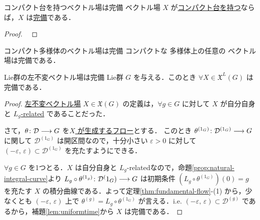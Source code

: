 \documentclass[TQFT_main]{subfiles}
\begin{document}
\begin{mytheo}[label=thm:complete-compace]{コンパクト台を持つベクトル場は完備}
    \cinfty ベクトル場 $X$ が\hyperref[def:vecf]{コンパクト台を持つ}ならば，$X$ は\hyperref[def:complete-vecf]{完備}である．
\end{mytheo}

\begin{proof}
    ~\cite[p.216, Theorem 9.16]{Lee2012smooth}
\end{proof}


\begin{mycol}[label=col:complete-compact]{コンパクト多様体のベクトル場は完備}
    コンパクトな \cinfty 多様体上の任意の \cinfty ベクトル場は完備である．
\end{mycol}


\begin{mytheo}[label=thm:left-invariant-complete]{Lie群の左不変ベクトル場は完備}
    Lie群 $G$ を与える．このとき $\forall X \in \mathfrak{X}^L(G)$ は完備である．
\end{mytheo}

\begin{proof}
    \hyperref[def:left-invariant]{左不変ベクトル場} $X \in \mathfrak{X}(G)$ の定義は，$\forall g \in G$ に対して $X$ が自分自身と \hyperref[def:F-related]{$L_g$-related} であることだった．

    さて，$\theta \colon \mathcal{D} \longrightarrow G$ を\hyperref[thm:fundamental-flow]{$X$ が生成するフロー}とする．
    このとき $\theta^{(1_G)} \colon \mathcal{D}^{(1_G)} \longrightarrow G$ に関して $\mathcal{D}^{(1_G)}$ は開区間なので，十分小さい $\varepsilon > 0$ に対して $(-\varepsilon,\, \varepsilon) \subset \mathcal{D}^{(1_G)}$ を充たすようにできる．

    $\forall g \in G$ を1つとる．$X$ は自分自身と $L_g$-relatedなので，命題\ref{prop:natural-integral-curve}より $L_g \circ \theta^{(1_g)} \colon \mathcal{D}^(1_G) \longrightarrow G$ は初期条件 $(L_g \circ \theta^{(1_G)})(0) = g$ を充たす $X$ の積分曲線である．よって定理\ref{thm:fundamental-flow}-(1) から，少なくとも $(-\varepsilon,\, \varepsilon)$ 上で $\theta^{(g)} = L_g \circ \theta^{(1_G)}$ が言える．i.e. $(-\varepsilon,\, \varepsilon) \subset \mathcal{D}^{(g)}$ であるから，補題\ref{lem:uniformtime}から $X$ は完備である．
\end{proof}
\end{document}
